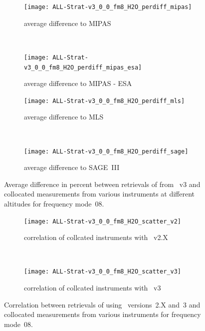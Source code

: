 \begin{figure}[tbhp]
    \centering
    \begin{subfigure}[b]{0.49\textwidth}
        \texttt{[image: ALL-Strat-v3\_0\_0\_fm8\_H2O\_perdiff\_mipas]}
        \caption{average difference to MIPAS}
        \label{fig:fm08:H2O:profiles:MIPAS}
    \end{subfigure}
    \,
    \begin{subfigure}[b]{0.49\textwidth}
        \texttt{[image: ALL-Strat-v3\_0\_0\_fm8\_H2O\_perdiff\_mipas\_esa]}
        \caption{average difference to MIPAS - ESA}
        \label{fig:fm08:H2O:profiles:MIPAS-ESA}
    \end{subfigure}

    \begin{subfigure}[b]{0.49\textwidth}
        \texttt{[image: ALL-Strat-v3\_0\_0\_fm8\_H2O\_perdiff\_mls]}
        \caption{average difference to MLS}
        \label{fig:fm08:H2O:profiles:MLS}
    \end{subfigure}
    \,
    \begin{subfigure}[b]{0.49\textwidth}
        \texttt{[image: ALL-Strat-v3\_0\_0\_fm8\_H2O\_perdiff\_sage]}
        \caption{average difference to SAGE~III}
        \label{fig:fm08:H2O:profiles:SAGEIII}
    \end{subfigure}
    \caption{Average difference in percent between retrievals of 
    from \smr~v3 and collocated measurements from various instruments at
    different altitudes for frequency mode~08.}

    \label{fig:fm08:H2O:profiles}
\end{figure}

\begin{figure}[tbhp]
    \centering
    \begin{subfigure}[b]{0.49\textwidth}
        \texttt{[image: ALL-Strat-v3\_0\_0\_fm8\_H2O\_scatter\_v2]}
        \caption{correlation of collcated instruments with \smr~v2.X}
        \label{fig:fm08:H2O:scatter:v2}
    \end{subfigure}
    \,
    \begin{subfigure}[b]{0.49\textwidth}
        \texttt{[image: ALL-Strat-v3\_0\_0\_fm8\_H2O\_scatter\_v3]}
        \caption{correlation of collcated instruments with \smr~v3}
        \label{fig:fm08:H2O:scatter:v3}
    \end{subfigure}
    \caption{Correlation between retrievals of  using \smr\
    versions~2.X and~3 and collocated measurements from various instruments
    for frequency mode~08.}
    \label{fig:fm08:H2O:scatter}
\end{figure}

